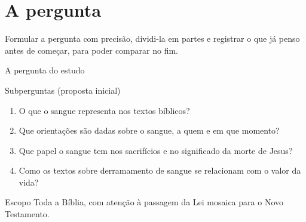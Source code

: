 \chapter{A pergunta}

\begin{objetivo}
Formular a pergunta com precisão, dividi-la em partes e registrar o que já
penso antes de começar, para poder comparar no fim.
\end{objetivo}

\begin{campo}{A pergunta do estudo}
\temaPergunta
\end{campo}

\begin{campo}{Subperguntas (proposta inicial)}
\begin{enumerate}
  \item O que o sangue representa nos textos bíblicos?
  \item Que orientações são dadas sobre o sangue, a quem e em que momento?
  \item Que papel o sangue tem nos sacrifícios e no significado da morte de Jesus?
  \item Como os textos sobre derramamento de sangue se relacionam com o valor da vida?
\end{enumerate}
\end{campo}


\begin{campo}{Escopo}
Toda a Bíblia, com atenção à passagem da Lei mosaica para o Novo Testamento.
\end{campo}
